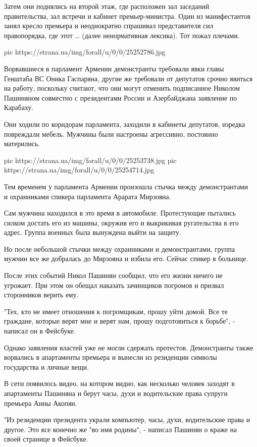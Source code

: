 Затем они поднялись на второй этаж, где расположен зал заседаний правительства,
зал встречи и кабинет премьер-министра. Один из манифестантов занял кресло
премьера и неоднократно спрашивал представителя сил правопорядка, где этот …
(далее ненормативная лексика). Тот пожал плечами.

\ifcmt
pic https://strana.ua/img/forall/u/0/0/25252786.jpg
\fi

Ворвавшиеся в парламент Армении демонстранты требовали явки главы Генштаба ВС
Оника Гаспаряна, другие же требовали от депутатов срочно явиться на работу,
поскольку считают, что они могут отменить подписанное Николом Пашиняном
совместно с президентами России и Азербайджана заявление по Карабаху. 

Они ходили по коридорам парламента, заходили в кабинеты депутатов, изредка
повреждали мебель. Мужчины были настроены агрессивно, постоянно матерились. 

\ifcmt
pic https://strana.ua/img/forall/u/0/0/25253738.jpg
pic https://strana.ua/img/forall/u/0/0/25254714.jpg
\fi

Тем временем у парламента Армении произошла стычка между демонстрантами и
охранниками спикера парламента Арарата Мирзояна.

Сам мужчина находился в это время в автомобиле. Протестующие пытались силком
достать его из машины, окружив его и выкрикивая ругательства в его адрес.
Группа военных была вынуждена выйти на защиту.

Но после небольшой стычки между охранниками и демонстрантами, группа мужчин все
же добралась до Мирзояна и избила его. Сейчас спикер в больнице.

После этих событий Никол Пашинян сообщил, что его жизни ничего не угрожает. При
этом он обещал наказать зачинщиков погромов и призвал сторонников верить ему.

"Тех, кто не имеет отношения к погромщикам, прошу уйти домой. Все те граждане,
которые верят мне и верят нам, прошу подготовиться к борьбе", - написал он в
Фейсбуке.

Однако заявления властей уже не могли сдержать протестов. Демонстранты также
ворвались в апартаменты премьера и вынесли из резиденции символы государства и
личные вещи.

В сети появилось видео, на котором видно, как несколько человек заходят в
апартаменты Пашиняна и берут часы, духи и водительские права супруги премьера
Анны Акопян.

"Из резиденции президента украли компьютер, часы, духи, водительские права и
другое. Это все конечно же "во имя родины", - написал Пашинян о краже на своей
странице в Фейсбуке.

